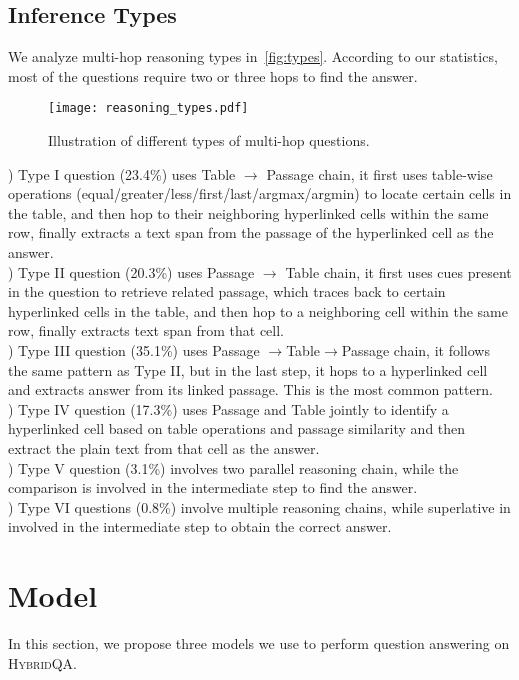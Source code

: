 \documentclass[11pt,a4paper]{article}
\newcommand{\dataset}{\textsc{HybridQA}\xspace}
\begin{document}
\subsection{Inference Types}
We analyze multi-hop reasoning types in~\autoref{fig:types}. According to our statistics, most of the questions require two or three hops to find the answer.
\begin{figure*}[thb]
    \centering
    \texttt{[image: reasoning\_types.pdf]}
    \caption{Illustration of different types of multi-hop questions.}
    \label{fig:types}
    \vspace{-2ex}
\end{figure*}

) Type I question (23.4\%)  uses Table $\rightarrow$ Passage chain, it first uses table-wise operations (equal/greater/less/first/last/argmax/argmin) to locate certain cells in the table, and then hop to their neighboring hyperlinked cells within the same row, finally extracts a text span from the passage of the hyperlinked cell as the answer. \\
) Type II question (20.3\%) uses Passage $\rightarrow$ Table chain, it first uses cues present in the question to retrieve related passage, which traces back to certain hyperlinked cells in the table, and then hop to a neighboring cell within the same row, finally extracts text span from that cell. \\
) Type III question (35.1\%) uses Passage $\rightarrow $Table$ \rightarrow $Passage chain, it follows the same pattern as Type II, but in the last step, it hops to a hyperlinked cell and extracts answer from its linked passage. This is the most common pattern. \\
) Type IV question (17.3\%) uses Passage and Table jointly to identify a hyperlinked cell based on table operations and passage similarity and then extract the plain text from that cell as the answer. \\
) Type V question (3.1\%) involves two parallel reasoning chain, while the comparison is involved in the intermediate step to find the answer. \\
) Type VI questions (0.8\%) involve multiple reasoning chains, while superlative in involved in the intermediate step to obtain the correct answer. 



\section{Model}
In this section, we propose three models we use to perform question answering on \dataset.
\end{document}
